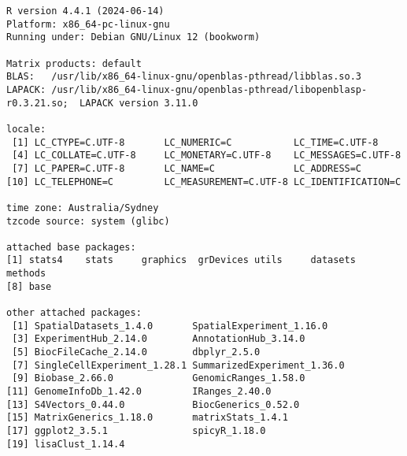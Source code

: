 \documentclass[
  letterpaper,
  DIV=11,
  numbers=noendperiod]{scrreprt}
\begin{document}
\begin{verbatim}
R version 4.4.1 (2024-06-14)
Platform: x86_64-pc-linux-gnu
Running under: Debian GNU/Linux 12 (bookworm)

Matrix products: default
BLAS:   /usr/lib/x86_64-linux-gnu/openblas-pthread/libblas.so.3 
LAPACK: /usr/lib/x86_64-linux-gnu/openblas-pthread/libopenblasp-r0.3.21.so;  LAPACK version 3.11.0

locale:
 [1] LC_CTYPE=C.UTF-8       LC_NUMERIC=C           LC_TIME=C.UTF-8       
 [4] LC_COLLATE=C.UTF-8     LC_MONETARY=C.UTF-8    LC_MESSAGES=C.UTF-8   
 [7] LC_PAPER=C.UTF-8       LC_NAME=C              LC_ADDRESS=C          
[10] LC_TELEPHONE=C         LC_MEASUREMENT=C.UTF-8 LC_IDENTIFICATION=C   

time zone: Australia/Sydney
tzcode source: system (glibc)

attached base packages:
[1] stats4    stats     graphics  grDevices utils     datasets  methods  
[8] base     

other attached packages:
 [1] SpatialDatasets_1.4.0       SpatialExperiment_1.16.0   
 [3] ExperimentHub_2.14.0        AnnotationHub_3.14.0       
 [5] BiocFileCache_2.14.0        dbplyr_2.5.0               
 [7] SingleCellExperiment_1.28.1 SummarizedExperiment_1.36.0
 [9] Biobase_2.66.0              GenomicRanges_1.58.0       
[11] GenomeInfoDb_1.42.0         IRanges_2.40.0             
[13] S4Vectors_0.44.0            BiocGenerics_0.52.0        
[15] MatrixGenerics_1.18.0       matrixStats_1.4.1          
[17] ggplot2_3.5.1               spicyR_1.18.0              
[19] lisaClust_1.14.4           


\end{verbatim}
\end{document}
